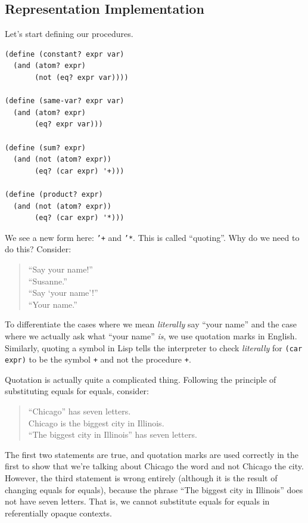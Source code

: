 \documentclass[9pt]{report}
\begin{document}
\subsection{Representation Implementation}
\label{sec:org433a87c}

Let's start defining our procedures.

\begin{verbatim}
(define (constant? expr var)
  (and (atom? expr)
       (not (eq? expr var))))

(define (same-var? expr var)
  (and (atom? expr)
       (eq? expr var)))

(define (sum? expr)
  (and (not (atom? expr))
       (eq? (car expr) '+)))

(define (product? expr)
  (and (not (atom? expr))
       (eq? (car expr) '*)))
\end{verbatim}

We see a new form here: \texttt{'+} and \texttt{'*}. This is called ``quoting''.
Why do we need to do this? Consider:

\begin{verse}
``Say your name!''\\
``Susanne.''\\
``Say `your name'!''\\
``Your name.''\\
\end{verse}

To differentiate the cases where we mean \emph{literally} say ``your
name'' and the case where we actually ask what ``your name'' \emph{is}, we
use quotation marks in English. Similarly, quoting a symbol in
Lisp tells the interpreter to check \emph{literally} for \texttt{(car expr)}
to be the symbol \texttt{+} and not the procedure \texttt{+}.

Quotation is actually quite a complicated thing. Following the
principle of substituting equals for equals, consider:

\begin{verse}
``Chicago'' has seven letters.\\
Chicago is the biggest city in Illinois.\\
``The biggest city in Illinois'' has seven letters.\\
\end{verse}

The first two statements are true, and quotation marks are used
correctly in the first to show that we're talking about Chicago
the word and not Chicago the city. However, the third statement is
wrong entirely (although it is the result of changing equals for
equals), because the phrase ``The biggest city in Illinois'' does
not have seven letters.
That is, we cannot substitute equals for equals in referentially
opaque contexts.
\end{document}

